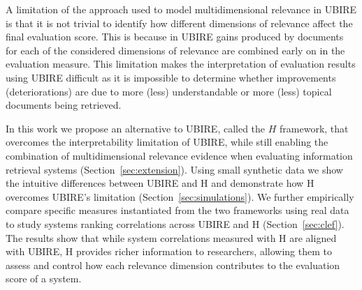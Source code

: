A limitation of the approach used to model multidimensional relevance in UBIRE is that it is not trivial to identify how different dimensions of relevance affect the final evaluation score. This is because in UBIRE gains produced by documents for each of the considered dimensions of relevance are combined early on in the evaluation measure. This limitation makes the interpretation of evaluation results using UBIRE difficult as it is impossible to determine whether improvements (deteriorations) are due to more (less) understandable or more (less) topical documents being retrieved. 

In this work we propose an alternative to UBIRE, called the $H$ framework, that overcomes the interpretability limitation of UBIRE, while still enabling the combination of multidimensional relevance evidence when evaluating information retrieval systems (Section~\ref{sec:extension}). Using small synthetic data we show the intuitive differences between UBIRE and H and demonstrate how H overcomes UBIRE's limitation (Section~\ref{sec:simulations}). We further empirically compare specific measures instantiated from the two frameworks using real data to study systems ranking correlations across UBIRE and H (Section~\ref{sec:clef}). The results show that while system correlations measured with H are aligned with UBIRE, H provides richer information to researchers, allowing them to assess and control how each relevance dimension contributes
to the evaluation score of a system.




